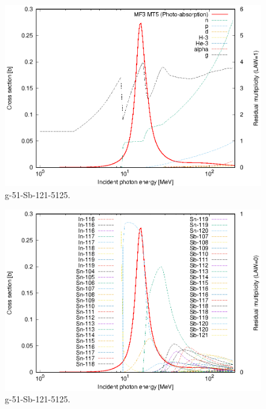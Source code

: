 \begin{figure}
 \includegraphics[width=\linewidth]{eps/g_51-Sb-121_5125.eps}
  \caption{g-51-Sb-121-5125.}
\end{figure}
\begin{figure}
 \includegraphics[width=\linewidth]{eps-law0/g_51-Sb-121_5125.eps}
 \caption{g-51-Sb-121-5125.}
\end{figure}
\newpage \clearpage

